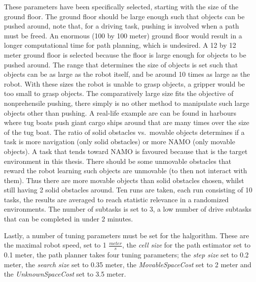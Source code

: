 These parameters have been specifically selected, starting with the size of the ground floor. The ground floor should be large enough such that objects can be pushed around, note that, for a driving task, pushing is involved when a path must be freed. An enormous (100 by 100 meter) ground floor would result in a longer computational time for path planning, which is undesired. A 12 by 12 meter ground floor is selected because the floor is large enough for objects to be pushed around. The range that determines the size of objects is set such that objects can be as large as the robot itself, and be around 10 times as large as the robot. With these sizes the robot is unable to grasp objects, a gripper would be too small to grasp objects. The comparatively large size fits the objective of nonprehensile pushing, there simply is no other method to manipulate such large objects other than pushing. A real-life example are can be found in harbours where tug boats push giant cargo ships around that are many times over the size of the tug boat. The ratio of solid obstacles vs.~movable objects determines if a task is more navigation (only solid obstacles) or more \ac{NAMO} (only movable objects). A task that tends toward \ac{NAMO} is favoured because that is the target environment in this thesis. There should be some unmovable obstacles that reward the robot learning such objects are unmovable (to then not interact with them). Thus there are more movable objects than solid obstacles chosen, whilst still having 2 solid obstacles around. Ten runs are taken, each run consisting of 10 tasks, the results are averaged to reach statistic relevance in a randomized environments. The number of subtasks is set to 3, a low number of drive subtasks that can be completed in under 2 minutes.\bs

Lastly, a number of tuning parameters must be set for the \ac{halgorithm}. These are the maximal robot speed, set to 1 $\frac{\mathit{meter}}{\mathit{s}}$, the \textit{cell size} for the path estimator set to 0.1 meter, the path planner takes four tuning parameters; the \textit{step size} set to 0.2 meter, the \textit{search size} set to 0.35 meter, the \textit{MovableSpaceCost} set to 2 meter and the \textit{UnknownSpaceCost} set to 3.5 meter.\bs

